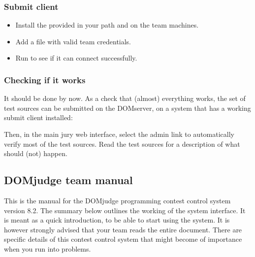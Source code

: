 \documentclass[a4paper,10pt,english,openany]{sphinxmanual}
\begin{document}
\subsubsection{Submit client}
\label{\detokenize{quick-install:submit-client}}\begin{itemize}
\item {} 
\sphinxAtStartPar
Install the provided  in your path and on the team machines.

\item {} 
\sphinxAtStartPar
Add a  file with valid team credentials.

\item {} 
\sphinxAtStartPar
Run  to see if it can connect successfully.

\end{itemize}


\subsubsection{Checking if it works}
\label{\detokenize{quick-install:checking-if-it-works}}
\sphinxAtStartPar
It should be done by now. As a check that (almost) everything works,
the set of test sources can be submitted on the DOMserver, on
a system that has a working submit client installed:

\begin{sphinxVerbatim}[commandchars=\\\{\}]
 
 
\end{sphinxVerbatim}

\sphinxAtStartPar
Then, in the main jury web interface, select the admin link
 to automatically verify most of the
test sources. Read the test sources for a description of
what should (not) happen.

\sphinxstepscope


\subsection{DOMjudge team manual}
\label{\detokenize{team:domjudge-team-manual}}\label{\detokenize{team::doc}}

\sphinxAtStartPar
This is the manual for the DOMjudge programming contest control system
version 8.2.
The summary below outlines the working of the system interface. It
is meant as a quick introduction, to be able to start using the system.
It is however strongly advised that your team reads the entire document.
There are specific details of this contest control system that might
become of importance when you run into problems.
\end{document}
